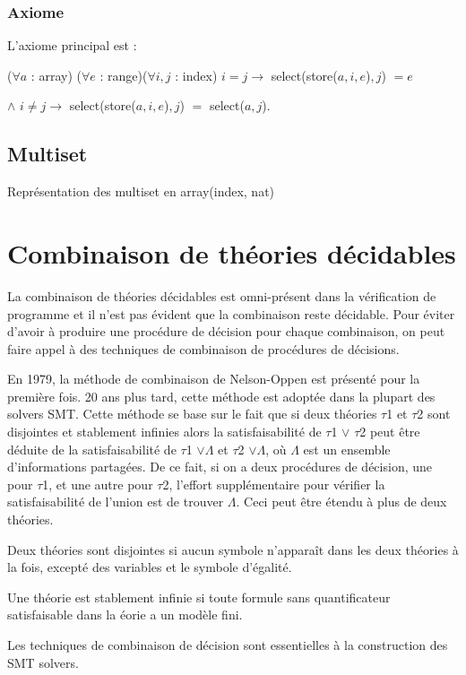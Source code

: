 \documentclass[9pt]{book}
\begin{document}
			\subsubsection{Axiome}
			L'axiome principal est : \par
 			($\forall a$ : array) ($\forall e$ : range)($\forall i,j$ : index) $i=j \rightarrow$ select(store($a,i,e$)$,j$) $ = e$
			\par $\land$ $i\neq j \rightarrow$ select(store($a,i,e$)$,j$) $=$ select($a,j$).
 		\subsection{Multiset}
 		Repr\'esentation des multiset en array(index, nat)

 	\section{Combinaison de th\'eories d\'ecidables}
 		La combinaison de th\'eories d\'ecidables est omni-pr\'esent dans la v\'erification de programme et il n'est pas \'evident que la combinaison reste d\'ecidable. Pour \'eviter d'avoir \`a produire une proc\'edure de d\'ecision pour chaque combinaison, on peut faire appel \`a des techniques de combinaison de proc\'edures de d\'ecisions.

 		En 1979, la m\'ethode de combinaison de Nelson-Oppen est pr\'esent\'e pour la premi\`ere fois. 20 ans plus tard, cette m\'ethode est adopt\'ee dans la plupart des solvers SMT. Cette m\'ethode se base sur le fait que si deux th\'eories $\tau$1 et $\tau$2 sont disjointes et stablement infinies alors la satisfaisabilit\'e de $\tau$1 $\lor$ $\tau$2 peut \^etre d\'eduite de la satisfaisabilit\'e de $\tau$1 $\lor \Lambda$ et $\tau$2 $\lor \Lambda$, o\`u $\Lambda$ est un ensemble d'informations partag\'ees. De ce fait, si on a deux proc\'edures de d\'ecision, une pour $\tau$1, et une autre pour $\tau$2, l'effort suppl\'ementaire pour v\'erifier la satisfaisabilit\'e de l'union est de trouver $\Lambda$. Ceci peut \^etre \'etendu \`a plus de deux th\'eories. \par
 		Deux th\'eories sont disjointes si aucun symbole n'appara\^it dans les deux th\'eories \`a la fois, except\'e des variables et le symbole d'\'egalit\'e. \par
 		Une th\'eorie est stablement infinie si toute formule sans quantificateur satisfaisable dans la \th\'eorie a un mod\`ele fini.

 		\par Les techniques de combinaison de d\'ecision sont essentielles \`a la construction des SMT solvers.
\end{document}
